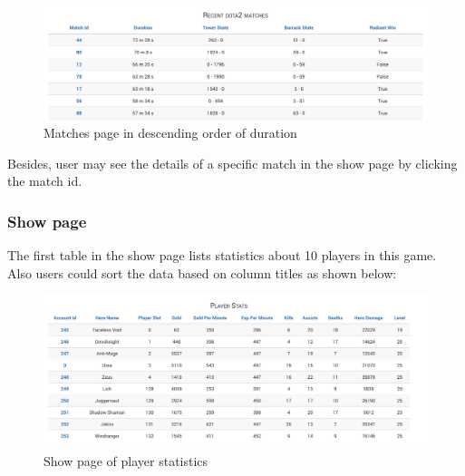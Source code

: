 \documentclass[a4paper]{article}
\begin{document}
\begin{figure}[H]
\centering
\includegraphics[width=1.0\textwidth]{matches_sort_byDuration2.png}
\caption{\label{fig:fig4}Matches page in descending order of duration}
\end{figure}
Besides, user may see the details of a specific match in the show page by clicking the match id.

\subsubsection{Show page}
The first table in the show page lists statistics about 10 players in this game. Also users could sort the data based on column titles as shown below:\par
\begin{figure}[H]
\centering
\includegraphics[width=1.0\textwidth]{show.png}
\caption{\label{fig:fig5}Show page of player statistics}
\end{figure}
\end{document}
